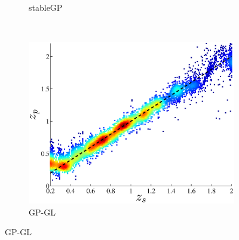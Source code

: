 \documentclass[useAMS,usenatbib,fleqn]{mn2e}
\begin{document}
\begin{figure}
\begin{subfigure}[b]{0.3\textwidth}
                \caption{stableGP}
        \end{subfigure}
        ~
        \begin{subfigure}[b]{0.3\textwidth}
                \includegraphics[width=\textwidth]{figures/GPGL.eps}
                \caption{GP-GL}
        \end{subfigure}
        

\end{figure}
\end{document}
